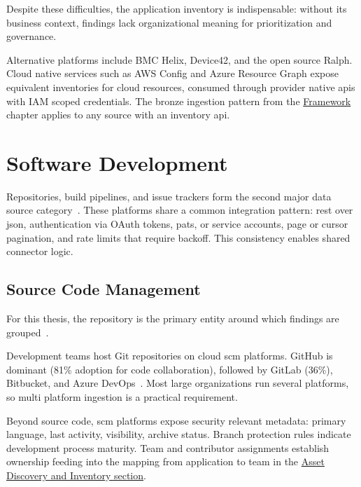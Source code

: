 Despite these difficulties, the application inventory is indispensable: without its business context, findings lack organizational meaning for prioritization and governance.

Alternative platforms include BMC Helix, Device42, and the open source Ralph. Cloud native services such as AWS Config and Azure Resource Graph expose equivalent inventories for cloud resources, consumed through provider native \glspl{api} with IAM scoped credentials. The bronze ingestion pattern from the \hyperref[ch:framework]{Framework} chapter applies to any source with an inventory \gls{api}.


\section{Software Development}
\label{sec:sw-dev-analysis}

Repositories, build pipelines, and issue trackers form the second major data source category~\cite{Sommerville2015, Pressman2019}. These platforms share a common integration pattern: \gls{rest} over \gls{json}, authentication via OAuth tokens, \glspl{pat}, or service accounts, page or cursor pagination, and rate limits that require backoff. This consistency enables shared connector logic.


\subsection{Source Code Management}

For this thesis, the repository is the primary entity around which findings are grouped~\cite{Chacon2014, Skoulikari2024, Winters2020}.

Development teams host Git repositories on cloud \gls{scm} platforms. GitHub is dominant (81\% adoption for code collaboration), followed by GitLab (36\%), Bitbucket, and Azure DevOps~\cite{StackOverflow2025, GitHub2025Octoverse}. Most large organizations run several platforms, so multi platform ingestion is a practical requirement.

Beyond source code, \gls{scm} platforms expose security relevant metadata: primary language, last activity, visibility, archive status. Branch protection rules indicate development process maturity. Team and contributor assignments establish ownership feeding into the mapping from application to team in the \hyperref[sec:app-inventory]{Asset Discovery and Inventory section}.

